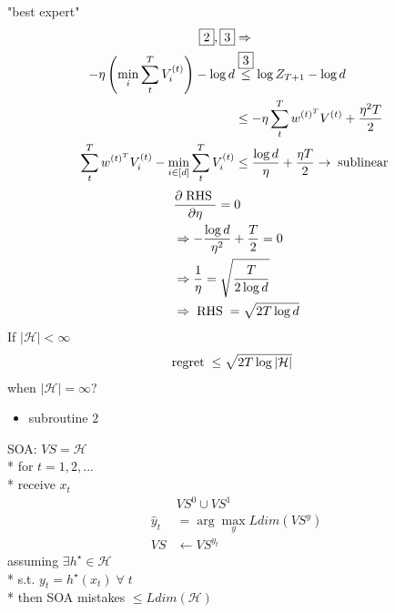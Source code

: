 \documentclass{article}
\begin{document}
"best expert"
\newline \newline
\begin{align*}
\boxed{2} , \boxed{3} &\Rightarrow 
\\ -\eta \left(\displaystyle\min_{i} \displaystyle\sum_{t}^{T} V_{i}^{\left(t\right)}\right) - \log d &\stackrel{\boxed{3}}{\leq} \log Z_{T+1} - \log d
\\ &\leq  - \eta \displaystyle\sum_{t}^{T} w^{\left(t\right)^{T}} V^{\left(t\right)} + \dfrac{\eta^{2} T}{2}
\\ \displaystyle\sum_{t}^{T} w^{\left(t\right)^{T}} V_{i}^{\left(t\right)} - \displaystyle\min_{i \in \left[d\right]} \displaystyle\sum_{t}^{T} V_{i}^{\left(t\right)} &\leq  \dfrac{\log d}{\eta} + \dfrac{\eta T}{2} \to  \text{\;sublinear\;}
\end{align*}
\begin{align*}
&  \dfrac{\partial \text{\;RHS\;}}{\partial \eta} = 0
\\ &\Rightarrow  - \dfrac{\log d}{\eta^{2}} + \dfrac{T}{2} = 0
\\ &\Rightarrow  \dfrac{1}{\eta} = \sqrt{\dfrac{T}{2 \log d}}
\\ &\Rightarrow  \text{\;RHS\;} = \sqrt{2 T \log d }
\end{align*}
If $\left|  \mathcal{H}  \right| < \infty$
\begin{align*}
\text{\;regret\;} &\leq  \sqrt{2 T \log \left|  \mathcal{H}  \right|}
\end{align*}
when $\left|  \mathcal{H}  \right| = \infty$?
\newline \newline
\begin{itemize}
\item subroutine $2$
\end{itemize}SOA: $VS  = \mathcal{H}$
\\* for $t  = 1, 2, ...$
\\* receive $x_{t}$
\begin{align*}
&VS^{0}  \cup VS^{1} 
\\ \hat{y}_{t} &= \arg\displaystyle\max_{y} Ldim\left(VS^{y} \right) 
\\ VS  &\leftarrow VS^{y_{t}} 
\end{align*}
assuming $\exists h^\star  \in \mathcal{H}$
\\* s.t. $y_{t} = h^\star \left(x_{t}\right) \;\forall\; t $
\\* then SOA mistakes $\leq  Ldim\left(\mathcal{H}\right) $
\newline \newline
\end{document}

